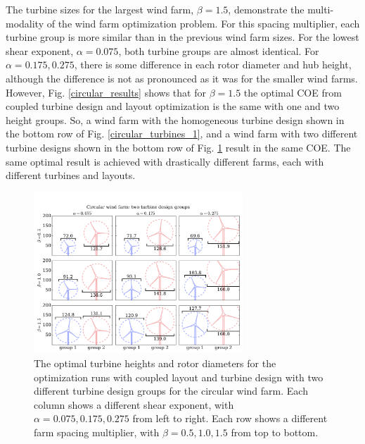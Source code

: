 \documentclass[wes, manuscript]{copernicus}
\begin{document}
The turbine sizes for the largest wind farm, $\beta=1.5$, demonstrate the multi-modality of the wind farm optimization problem. For this spacing multiplier, each turbine group is more similar than in the previous wind farm sizes. For the lowest shear exponent, $\alpha=0.075$, both turbine groups are almost identical. For $\alpha=0.175,0.275$, there is some difference in each rotor diameter and hub height, although the difference is not as pronounced as it was for the smaller wind farms. However, Fig. \ref{circular_results} shows that for $\beta=1.5$ the optimal COE from coupled turbine design and layout optimization is the same with one and two height groups. So, a wind farm with the homogeneous turbine design shown in the bottom row of Fig. \ref{circular_turbines_1}, and a wind farm with two different turbine designs shown in the bottom row of Fig. \ref{circular_turbines} result in the same COE. The same optimal result is achieved with drastically different farms, each with different turbines and layouts.  

\begin{figure}[htbp]
  \centering
  \includegraphics[trim={0.5cm 0.3cm 0.3cm 2.75cm},clip,width=0.7\textwidth]{Figures/turbineSizesCircular_2.pdf}
  \caption{\label{circular_turbines} The optimal turbine heights and rotor diameters for the optimization runs with coupled layout and turbine design with two different turbine design groups for the circular wind farm. Each column shows a different shear exponent, with $\alpha=0.075,0.175,0.275$ from left to right. Each row shows a different farm spacing multiplier, with $\beta=0.5,1.0,1.5$ from top to bottom.}
\end{figure}
\end{document}
